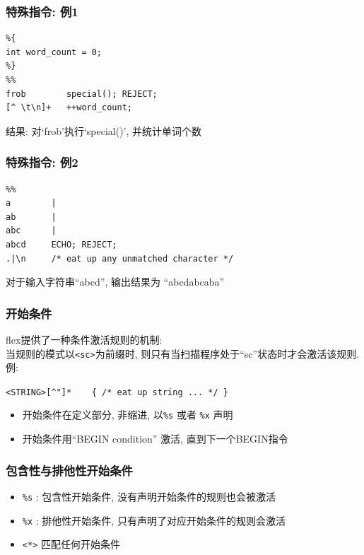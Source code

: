 \documentclass[compress]{beamer}
\begin{document}
\begin{frame}[containsverbatim]
\frametitle{特殊指令: 例1}

\begin{Verbatim}
%{
int word_count = 0;
%}
%%
frob        special(); REJECT;
[^ \t\n]+   ++word_count;
\end{Verbatim}

结果: 对`frob'执行`special()', 并统计单词个数

\end{frame}

\begin{frame}[containsverbatim]
\frametitle{特殊指令: 例2}

\begin{Verbatim}
%%
a        |
ab       |
abc      |
abcd     ECHO; REJECT;
.|\n     /* eat up any unmatched character */
\end{Verbatim}

对于输入字符串``abcd'', 输出结果为 ``abcdabcaba''

\end{frame}

\begin{frame}[containsverbatim]
\frametitle{开始条件}

{flex}提供了一种条件激活规则的机制: \\
当规则的模式以\verb~<sc>~为前缀时, 则只有当扫描程序处于``sc''状态时才会激活该规则. 例:

\verb~<STRING>[^"]*    { /* eat up string ... */ }~

\begin{itemize}
\item 开始条件在定义部分, 非缩进, 以\verb~%s~ 或者 \verb~%x~ 声明
\item 开始条件用``BEGIN condition'' 激活, 直到下一个BEGIN指令
  \end{itemize}

  
\end{frame}

\begin{frame}[containsverbatim]
\frametitle{包含性与排他性开始条件}
\begin{itemize}
\item \verb~%s~ : 包含性开始条件, 没有声明开始条件的规则也会被激活
\item \verb~%x~ : 排他性开始条件, 只有声明了对应开始条件的规则会激活
\item \verb~<*>~ 匹配任何开始条件
\end{itemize}

\end{frame}
\end{document}
